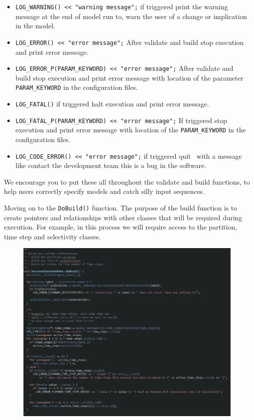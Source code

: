 \begin{itemize}
	\item \texttt{LOG\_WARNING() << "warning message";} if triggered print the warning message at the end of model run to, warn the user of a change or implication in the model.
	\item \texttt{LOG\_ERROR() << "error message";} After validate and build stop execution and print error message.
	\item \texttt{LOG\_ERROR\_P(PARAM\_KEYWORD) << "error message";} After validate and build stop execution and print error message with location of the parameter \texttt{PARAM\_KEYWORD} in the configuration files.
	\item \texttt{LOG\_FATAL()} if triggered halt execution and print error message.
	\item \texttt{LOG\_FATAL\_P(PARAM\_KEYWORD) << "error message";} If triggered stop execution and print error message with location of the \texttt{PARAM\_KEYWORD} in the configuration files.		
	\item \texttt{LOG\_CODE\_ERROR() << "error message";} if triggered quit \CNAME\ with a message like contact the development team this is a bug in the software.	
\end{itemize}

We encourage you to put these all throughout the validate and build functions, to help users correctly specify models and catch silly input sequences.


Moving on to the \texttt{DoBuild()} function. The purpose of the build function is to create pointers and relationships with other classes that will be required during execution. For example, in this process we will require access to the partition, time step and selectivity classes.

\begin{figure}[!ht]
	\centering
	\includegraphics[scale=0.7]{Figures/Build.png}
	\caption{}\label{fig:build}
\end{figure}


